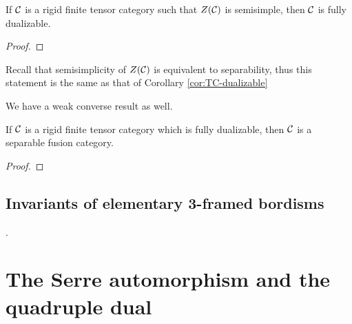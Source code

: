 \documentclass{amsart}
\begin{document}
\begin{theorem}
If $\mathcal C$ is a rigid finite tensor category such that $Z(\mathcal C)$ is semisimple, then $\mathcal C$ is fully dualizable.
\end{theorem}
\begin{proof}
\end{proof}

Recall that semisimplicity of $Z(\mathcal C)$ is equivalent to separability, thus this statement is the same as that of Corollary \ref{cor:TC-dualizable}

We have a weak converse result as well.

\begin{theorem}
If $\mathcal C$ is a rigid finite tensor category which is fully dualizable, then $\mathcal C$ is a separable fusion category.
\end{theorem}
\begin{proof}
\end{proof}


\subsection{Invariants of elementary 3-framed bordisms}
.



\section{The Serre automorphism and the quadruple dual} \label{sec-serre}
\end{document}
